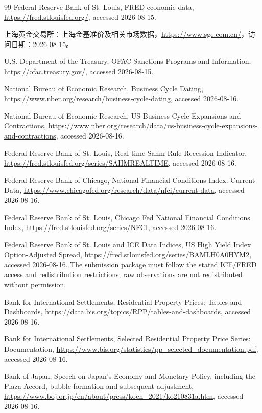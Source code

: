 \documentclass[UTF8,fontset=windows,12pt,openany]{ctexbook}
\begin{document}
\begin{thebibliography}{99}
Federal Reserve Bank of St. Louis, FRED economic data, \url{https://fred.stlouisfed.org/}, accessed 2026-08-15.

上海黄金交易所：上海金基准价及相关市场数据，\url{https://www.sge.com.cn/}，访问日期：2026-08-15。

U.S. Department of the Treasury, OFAC Sanctions Programs and Information, \url{https://ofac.treasury.gov/}, accessed 2026-08-15.

National Bureau of Economic Research, Business Cycle Dating, \url{https://www.nber.org/research/business-cycle-dating}, accessed 2026-08-16.

National Bureau of Economic Research, US Business Cycle Expansions and Contractions, \url{https://www.nber.org/research/data/us-business-cycle-expansions-and-contractions}, accessed 2026-08-16.

Federal Reserve Bank of St. Louis, Real-time Sahm Rule Recession Indicator, \url{https://fred.stlouisfed.org/series/SAHMREALTIME}, accessed 2026-08-16.

Federal Reserve Bank of Chicago, National Financial Conditions Index: Current Data, \url{https://www.chicagofed.org/research/data/nfci/current-data}, accessed 2026-08-16.

Federal Reserve Bank of St. Louis, Chicago Fed National Financial Conditions Index, \url{https://fred.stlouisfed.org/series/NFCI}, accessed 2026-08-16.

Federal Reserve Bank of St. Louis and ICE Data Indices, US High Yield Index Option-Adjusted Spread, \url{https://fred.stlouisfed.org/series/BAMLH0A0HYM2}, accessed 2026-08-16. The submission package must follow the stated ICE/FRED access and redistribution restrictions; raw observations are not redistributed without permission.

Bank for International Settlements, Residential Property Prices: Tables and Dashboards, \url{https://data.bis.org/topics/RPP/tables-and-dashboards}, accessed 2026-08-16.

Bank for International Settlements, Selected Residential Property Price Series: Documentation, \url{https://www.bis.org/statistics/pp_selected_documentation.pdf}, accessed 2026-08-16.

Bank of Japan, Speech on Japan's Economy and Monetary Policy, including the Plaza Accord, bubble formation and subsequent adjustment, \url{https://www.boj.or.jp/en/about/press/koen_2021/ko210831a.htm}, accessed 2026-08-16.


\end{thebibliography}
\end{document}
